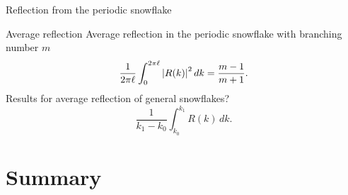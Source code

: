 \documentclass{beamer}
\newcommand{\abs}[1]{\left\lvert#1\right\rvert}
\begin{document}
\begin{frame}{Reflection from the periodic snowflake}
\begin{figure}
{\begin{subfigure}[t]{0.9\textwidth}
\end{subfigure}}%
%
\end{figure}%
  \end{frame}

  \begin{frame}{Average reflection}
    Average reflection in the periodic snowflake with branching number $m$
    \[
      \frac{1}{2\pi\ell} \int_{0}^{2\pi\ell} \abs{R(k)}^2 dk = \frac{m-1}{m+1}.
      \vspace{1em}
    \]
    \pause
    Results for average reflection of general snowflakes?
    \[
      \frac{1}{k_1-k_0} \int_{k_0}^{k_1} R(k) \, dk.
    \]
  \end{frame}

  \section*{Summary}
\end{document}
